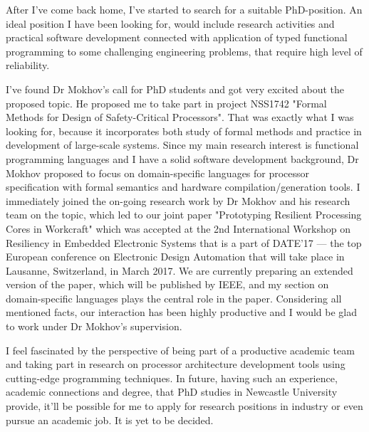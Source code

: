 \documentclass[11pt,a4paper,roman]{moderncv} %
\begin{document}
After I've come back home, I've started to search for a suitable PhD-position.
An ideal position I have been looking for, would include research activities
and practical software development connected with application of typed 
functional programming to some challenging engineering problems, that require
high level of reliability.

I've found Dr Mokhov's call for PhD students and got very excited about the 
proposed topic. He proposed me to take part in project NSS1742 "Formal Methods
for Design of Safety-Critical Processors". That was exactly what I was looking
for, because it incorporates both study of formal methods and practice in
development of large-scale systems. Since my main research interest is
functional programming languages and I have a solid software development
background, Dr Mokhov proposed to focus on domain-specific languages for
processor specification with formal semantics and hardware
compilation/generation tools. I immediately joined the on-going research work
by Dr Mokhov and his research team on the topic, which led to our joint paper
"Prototyping Resilient Processing Cores in Workcraft" which was accepted at the
2nd International Workshop on Resiliency in Embedded Electronic Systems that is
a part of DATE'17 --- the top European conference on Electronic Design
Automation that will take place in Lausanne, Switzerland, in March 2017.
We are currently preparing an extended version of the paper, which will be
published by IEEE, and my section on domain-specific languages plays the
central role in the paper. Considering all mentioned facts, our interaction has
been highly productive and I would be glad to work under Dr Mokhov's
supervision.

I feel fascinated by the perspective of being part of a productive academic
team and taking part in research on processor architecture development tools 
using cutting-edge programming techniques. In future, having such an experience, 
academic connections and degree, that PhD studies in Newcastle University 
provide, it'll be possible for me to apply for research positions in industry or
even pursue an academic job. It is yet to be decided.

\makeletterclosing %

\end{document}
